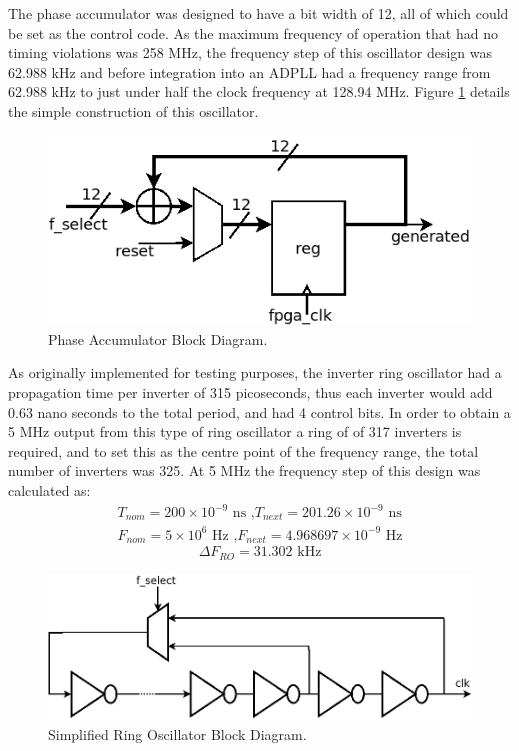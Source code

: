 \documentclass[11pt,english,british]{report}
\begin{document}
The phase accumulator was designed to have a bit width of 12, all of which could be set as the control code. As the maximum frequency of operation that had no timing violations was 258 MHz, the frequency step of this oscillator design was 62.988 kHz and before integration into an ADPLL had a frequency range from 62.988 kHz to just under half the clock frequency at 128.94 MHz. Figure \ref{fig:my_pa} details the simple construction of this oscillator.
\begin{figure}[h]
	\centering
	\includegraphics[scale=0.4]{../phase_accum}
	\caption{Phase Accumulator Block Diagram.}
	\label{fig:my_pa}
\end{figure}

As originally implemented for testing purposes, the inverter ring oscillator had a propagation time per inverter of 315 picoseconds, thus each inverter would add 0.63 nano seconds to the total period, and had 4 control bits. In order to obtain a 5 MHz output from this type of ring oscillator a ring of of 317 inverters is required, and to set this as the centre point of the frequency range, the total number of inverters was 325. At 5 MHz the frequency step of this design was calculated as:
\begin{align*}
T_{nom} = 200\times10^{-9}\text{ ns ,}T_{next} = 201.26\times10^{-9}\text{ ns} \\
F_{nom} = 5\times10^{6}\text{ Hz ,}F_{next} = 4.968697\times10^{-9}\text{ Hz}
\end{align*} 
\begin{equation*}
\Delta F_{RO} = 31.302\text{ kHz}
\end{equation*}
\begin{figure}[h]
	\centering
	\includegraphics[scale=0.275]{../ring_osc}
	\caption{Simplified Ring Oscillator Block Diagram.}
	\label{fig:my_ring_osc}
\end{figure}
\end{document}
